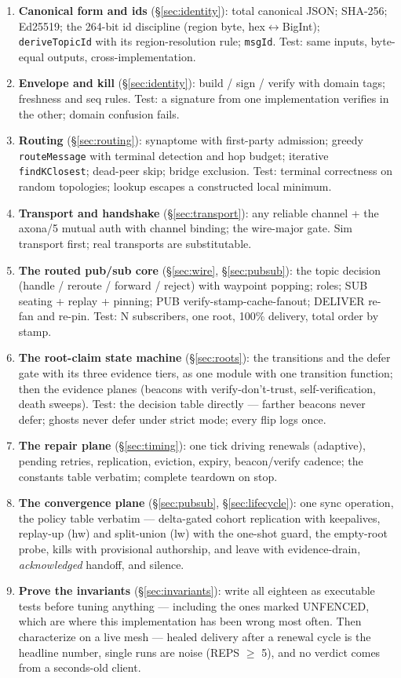 \documentclass[nobib]{tufte-handout}
\begin{document}
\begin{enumerate}
\item \textbf{Canonical form and ids} (\S\ref{sec:identity}): total
  canonical JSON; SHA-256; Ed25519; the 264-bit id discipline (region
  byte, hex$\leftrightarrow$BigInt); \texttt{deriveTopicId} with its
  region-resolution rule; \texttt{msgId}. Test: same inputs, byte-equal
  outputs, cross-implementation.
\item \textbf{Envelope and kill} (\S\ref{sec:identity}): build / sign /
  verify with domain tags; freshness and seq rules. Test: a signature
  from one implementation verifies in the other; domain confusion
  fails.
\item \textbf{Routing} (\S\ref{sec:routing}): synaptome with
  first-party admission; greedy \texttt{routeMessage} with terminal
  detection and hop budget; iterative \texttt{findKClosest}; dead-peer
  skip; bridge exclusion. Test: terminal correctness on random
  topologies; lookup escapes a constructed local minimum.
\item \textbf{Transport and handshake} (\S\ref{sec:transport}):
  any reliable channel + the axona/5 mutual auth with channel binding;
  the wire-major gate. Sim transport first; real transports are
  substitutable.
\item \textbf{The routed pub/sub core} (\S\ref{sec:wire},
  \S\ref{sec:pubsub}): the topic decision (handle / reroute / forward /
  reject) with waypoint popping; roles; SUB seating + replay + pinning;
  PUB verify-stamp-cache-fanout; DELIVER re-fan and re-pin. Test: N
  subscribers, one root, 100\% delivery, total order by stamp.
\item \textbf{The root-claim state machine} (\S\ref{sec:roots}): the
  transitions and the defer gate with its three evidence tiers, as one
  module with one transition function; then the evidence planes
  (beacons with verify-don't-trust, self-verification, death sweeps).
  Test: the decision table directly --- farther beacons never defer;
  ghosts never defer under strict mode; every flip logs once.
\item \textbf{The repair plane} (\S\ref{sec:timing}): one tick driving
  renewals (adaptive), pending retries, replication, eviction, expiry,
  beacon/verify cadence; the constants table verbatim; complete
  teardown on stop.
\item \textbf{The convergence plane} (\S\ref{sec:pubsub},
  \S\ref{sec:lifecycle}): one sync operation, the policy table
  verbatim --- delta-gated cohort replication with keepalives,
  replay-up (hw) and split-union (lw) with the one-shot guard, the
  empty-root probe, kills with provisional authorship, and leave with
  evidence-drain, \emph{acknowledged} handoff, and silence.
\item \textbf{Prove the invariants} (\S\ref{sec:invariants}): write all
  eighteen as executable tests before tuning anything --- including the
  ones marked UNFENCED, which are where this implementation has been
  wrong most often. Then characterize
  on a live mesh --- healed delivery after a renewal cycle is the
  headline number, single runs are noise (REPS $\ge$ 5), and no verdict
  comes from a seconds-old client.
\end{enumerate}
\end{document}
